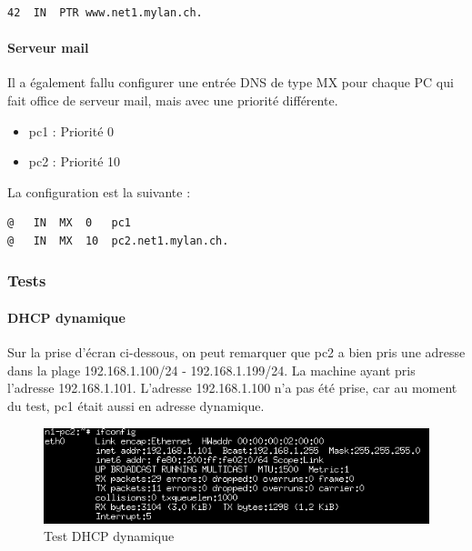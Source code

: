 \documentclass{article}
\begin{document}
\begin{lstlisting}
42	IN	PTR	www.net1.mylan.ch.
\end{lstlisting}

\paragraph{Serveur mail}

Il a également fallu configurer une entrée DNS de type MX pour chaque PC qui fait office de serveur mail, mais avec une priorité différente.

\begin{itemize}
	\item pc1 : Priorité 0
	\item pc2 : Priorité 10
\end{itemize}

La configuration est la suivante : 

\begin{lstlisting}
@	IN	MX	0	pc1
@	IN	MX	10	pc2.net1.mylan.ch.
\end{lstlisting}

\clearpage

\subsubsection{Tests}

\paragraph{DHCP dynamique}

Sur la prise d'écran ci-dessous, on peut remarquer que pc2 a bien pris une adresse dans la plage 192.168.1.100/24 - 192.168.1.199/24. La machine ayant pris l'adresse 192.168.1.101. L'adresse 192.168.1.100 n'a pas été prise, car au moment du test, pc1 était aussi en adresse dynamique.

\begin{figure}[!h]
	\centering
	\includegraphics{./captures/testpc2-dhcp.png}
	\caption{Test DHCP dynamique}
	\label{fig:Test DHCP dynamiqu}
\end{figure}
\end{document}
